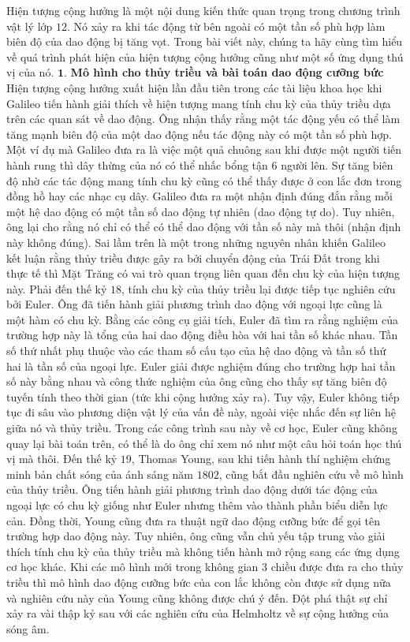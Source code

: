 \begin{multicols}{2}
	Hiện tượng cộng hưởng là một nội dung kiến thức quan trọng trong chương trình vật lý lớp $12$. Nó xảy ra khi tác động từ bên ngoài có một tần số phù hợp làm biên độ của dao động bị tăng vọt. Trong bài viết này, chúng ta hãy cùng tìm hiểu về quá trình phát hiện của hiện tượng cộng hưởng cũng như một số ứng dụng thú vị của nó.
	\vskip 0.1cm
	$\pmb{1.}$ \textbf{\color{timhieukhoahoc}Mô hình cho thủy triều và bài toán dao động cưỡng bức}
	\vskip 0.1cm
	Hiện tượng cộng hưởng xuất hiện lần đầu tiên trong các tài liệu khoa học khi Galileo tiến hành giải thích về hiện tượng mang tính chu kỳ của thủy triều dựa trên các quan sát về dao động. Ông nhận thấy rằng một tác động yếu có thể làm tăng mạnh biên độ của một dao động nếu tác động này có một tần số phù hợp. Một ví dụ mà Galileo đưa ra là việc một quả chuông sau khi được một người tiến hành rung thì dây thừng của nó có thể nhấc bổng tận $6$ người lên. Sự tăng biên độ nhờ các tác động mang tính chu kỳ cũng có thể thấy được ở con lắc đơn trong đồng hồ hay các nhạc cụ dây.
	\vskip 0.1cm
	Galileo đưa ra một nhận định đúng đắn rằng mỗi một hệ dao động có một tần số dao động tự nhiên (dao động tự do). Tuy nhiên, ông lại cho rằng nó chỉ có thể có thể dao động với tần số này mà thôi (nhận định này không đúng). Sai lầm trên là một trong những nguyên nhân khiến Galileo kết luận rằng thủy triều được gây ra bởi chuyển động của Trái Đất trong khi thực tế thì Mặt Trăng có vai trò quan trọng liên quan đến chu kỳ của hiện tượng này.
	\vskip 0.1cm
	Phải đến thế kỷ $18$, tính chu kỳ của thủy triều lại được tiếp tục nghiên cứu bởi Euler. Ông đã tiến hành giải phương trình dao động với ngoại lực cũng là một hàm có chu kỳ. Bằng các công cụ giải tích, Euler đã tìm ra rằng nghiệm của trường hợp này là tổng của hai dao động điều hòa với hai tần số khác nhau. Tần số thứ nhất phụ thuộc vào các tham số cấu tạo của hệ dao động và tần số thứ hai là tần số của ngoại lực. Euler giải được nghiệm đúng cho trường hợp hai tần số này bằng nhau và công thức nghiệm của ông cũng cho thấy sự tăng biên độ tuyến tính theo thời gian (tức khi cộng hưởng xảy ra). Tuy vậy, Euler không tiếp tục đi sâu vào phương diện vật lý của vấn đề này, ngoài việc nhắc đến sự liên hệ giữa nó và thủy triều. Trong các công trình sau này về cơ học, Euler cũng không quay lại bài toán trên, có thể là do ông chỉ xem nó như một câu hỏi toán học thú vị mà thôi.
	\vskip 0.1cm
	Đến thế kỷ $19$, Thomas Young, sau khi tiến hành thí nghiệm chứng minh bản chất sóng của ánh sáng năm $1802$, cũng bắt đầu nghiên cứu về mô hình của thủy triều. Ông tiến hành giải phương trình dao động dưới tác động của ngoại lực có chu kỳ giống như Euler nhưng thêm vào thành phần biểu diễn lực cản. Đồng thời, Young cũng đưa ra thuật ngữ dao động cưỡng bức để gọi tên trường hợp dao động này. Tuy nhiên, ông cũng vẫn chủ yếu tập trung vào giải thích tính chu kỳ của thủy triều mà không tiến hành mở rộng sang các ứng dụng cơ học khác. Khi các mô hình mới trong không gian $3$ chiều được đưa ra cho thủy triều thì mô hình dao động cưỡng bức của con lắc không còn được sử dụng nữa và nghiên cứu này của Young cũng không được chú ý đến. Đột phá thật sự chỉ xảy ra vài thập kỷ sau với các nghiên cứu của Helmholtz về sự cộng hưởng của sóng âm.

\end{multicols}
